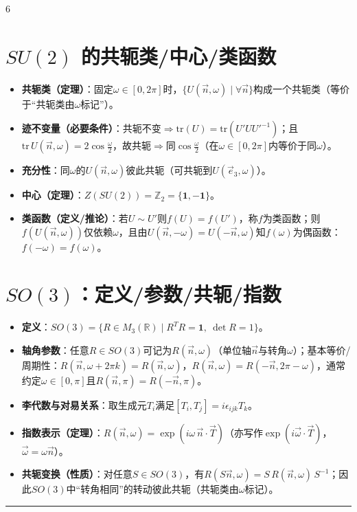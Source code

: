 \documentclass[landscape]{article}
\begin{document}
\begin{multicols*}{6}
\section*{$SU(2)$ 的共轭类/中心/类函数}
\begin{itemize}
  \item \textbf{共轭类（定理）}：固定$\omega\in[0,2\pi]$时，$\{U(\vec n,\omega)\mid \forall \vec n\}$构成一个共轭类（等价于“共轭类由$\omega$标记”）。
  \item \textbf{迹不变量（必要条件）}：共轭不变$\Rightarrow \mathrm{tr}(U)=\mathrm{tr}(U'U{U'}^{-1})$；且$\mathrm{tr}\,U(\vec n,\omega)=2\cos\frac{\omega}{2}$，故共轭$\Rightarrow$同$\cos\frac{\omega}{2}$（在$\omega\in[0,2\pi]$内等价于同$\omega$）。
  \item \textbf{充分性}：同$\omega$的$U(\vec n,\omega)$彼此共轭（可共轭到$U(\vec e_3,\omega)$）。
  \item \textbf{中心（定理）}：$Z(SU(2))=\mathbb{Z}_2=\{\mathbf{1},-\mathbf{1}\}$。
  \item \textbf{类函数（定义/推论）}：若$U\sim U'$则$f(U)=f(U')$，称$f$为类函数；则$f(U(\vec n,\omega))$仅依赖$\omega$，且由$U(\vec n,-\omega)=U(-\vec n,\omega)$知$f(\omega)$为偶函数：$f(-\omega)=f(\omega)$。
\end{itemize}

\section*{$SO(3)$：定义/参数/共轭/指数}
\begin{itemize}
  \item \textbf{定义}：$SO(3)=\{R\in M_{3}(\mathbb{R})\mid R^{T}R=\mathbf{1},\ \det R=1\}$。
  \item \textbf{轴角参数}：任意$R\in SO(3)$可记为$R(\vec n,\omega)$（单位轴$\vec n$与转角$\omega$）；基本等价/周期性：$R(\vec n,\omega+2\pi k)=R(\vec n,\omega)$，$R(\vec n,\omega)=R(-\vec n,2\pi-\omega)$，通常约定$\omega\in[0,\pi]$且$R(\vec n,\pi)=R(-\vec n,\pi)$。
  \item \textbf{李代数与对易关系}：取生成元$T_i$满足$[T_i,T_j]=i\epsilon_{ijk}T_k$。
  \item \textbf{指数表示（定理）}：$R(\vec n,\omega)=\exp(i\omega\,\vec n\cdot\vec T)$（亦写作$\exp(i\vec\omega\cdot\vec T)$，$\vec\omega=\omega\vec n$）。
  \item \textbf{共轭变换（性质）}：对任意$S\in SO(3)$，有$R(S\vec n,\omega)=S\,R(\vec n,\omega)\,S^{-1}$；因此$SO(3)$中“转角相同”的转动彼此共轭（共轭类由$\omega$标记）。
\end{itemize}
\noindent\textcolor{blue}{\rule{\linewidth}{1pt}}

\end{multicols*}
\end{document}

